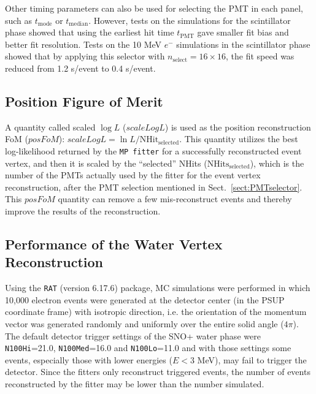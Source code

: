 \begin{itemize}
		Other timing parameters can also be used for selecting the PMT in each panel, such as $t_\mathrm{mode}$ or $t_\mathrm{median}$. However, tests on the simulations for the scintillator phase showed that using the earliest hit time $t_\mathrm{PMT}$ gave smaller fit bias and better fit resolution. Tests on the 10 MeV $e^-$ simulations in the scintillator phase showed that by applying this selector with $n_\mathrm{select}=16\times16$, the fit speed was reduced from 1.2 s/event to 0.4 s/event.
\end{itemize}

\subsection{Position Figure of Merit}\label{sect:positionFoM}

A quantity called scaled $\log L$ ($scaleLogL$) is used as the position reconstruction FoM ($posFoM$): $scaleLogL = \ln L/\mathrm{NHit}_\mathrm{selected}$. This quantity utilizes the best log-likelihood returned by the \texttt{MP fitter} for a successfully reconstructed event vertex, and then it is scaled by the ``selected'' NHits ($\mathrm{NHits}_\mathrm{selected}$), which is the number of the PMTs actually used by the fitter for the event vertex reconstruction, after the PMT selection mentioned in Sect.~\ref{sect:PMTselector}. This $posFoM$ quantity can remove a few mis-reconstruct events and thereby improve the results of the reconstruction.

\subsection{Performance of the Water Vertex Reconstruction}\label{sect:waterFitterVertex}

Using the \texttt{RAT} (version 6.17.6) package, MC simulations were performed in which 10,000 electron events were generated at the detector center (in the PSUP coordinate frame) with isotropic direction, i.e. the orientation of the momentum vector was generated randomly and uniformly over the entire solid angle ($4\pi$). The default detector trigger settings of the SNO+ water phase were \texttt{N100Hi}=21.0, \texttt{N100Med}=16.0 and \texttt{N100Lo}=11.0 and with those settings some events, especially those with lower energies ($E<3$ MeV), may fail to trigger the detector. Since the fitters only reconstruct triggered events, the number of events reconstructed by the fitter may be lower than the number simulated.

